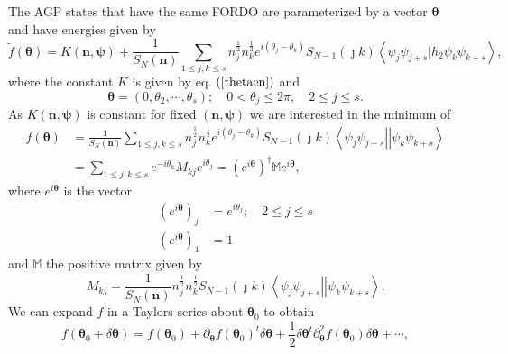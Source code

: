 \documentclass[aps,preprint]{revtex4}%
\begin{document}
The AGP states that have the same FORDO are parameterized by a vector
$\mathbf{\theta}$ and have energies given by
\begin{equation}
\tilde{f}\left(  \mathbf{\theta}\right)  =K\left(  \mathbf{n},\mathbf{\psi
}\right)  +\frac{1}{S_{N}\left(  \mathbf{n}\right)  }\sum_{1\leq j,k\leq
s}n_{j}^{\frac{1}{2}}n_{k}^{\frac{1}{2}}e^{i\left(  \theta_{j}-\theta
_{k}\right)  }S_{N-1}\left(  \jmath k\right)  \left\langle \psi_{j}\psi
_{j+s}|h_{2}\psi_{k}\psi_{k+s}\right\rangle ,
\end{equation}
where the constant $K$ is given by eq. $\left(  \ref{thetaen}\right)  $ and
\begin{equation}
\mathbf{\theta}=\left(  0,\theta_{2},\cdots,\theta_{s}\right)  ;\quad
0<\theta_{j}\leq2\pi,\quad2\leq j\leq s.
\end{equation}
As $K\left(  \mathbf{n},\mathbf{\psi}\right)  $ is constant for fixed $\left(
\mathbf{n},\mathbf{\psi}\right)  $ we are interested in the minimum of
\begin{align}
f\left(  \mathbf{\theta}\right)   &  =\frac{1}{S_{N}\left(  \mathbf{n}\right)
}\sum_{1\leq j,k\leq s}n_{j}^{\frac{1}{2}}n_{k}^{\frac{1}{2}}e^{i\left(
\theta_{j}-\theta_{k}\right)  }S_{N-1}\left(  \jmath k\right)  \left\langle
\psi_{j}\psi_{j+s}\right\vert \left\vert \psi_{k}\psi_{k+s}\right\rangle
\nonumber\\
&  =\sum_{1\leq j,k\leq s}e^{-i\theta_{k}}M_{kj}e^{i\theta_{j}}=\left(
e^{i\mathbf{\theta}}\right)  ^{\dagger}\mathbb{M}e^{i\mathbf{\theta}},
\end{align}
where $e^{i\mathbf{\theta}}$ is the vector
\begin{align}
\left(  e^{i\mathbf{\theta}}\right)  _{j}  &  =e^{i\theta_{j}};\quad2\leq
j\leq s\nonumber\\
\left(  e^{i\mathbf{\theta}}\right)  _{1}  &  =1
\end{align}
and $\mathbb{M}$ the positive matrix given by
\begin{equation}
M_{kj}=\frac{1}{S_{N}\left(  \mathbf{n}\right)  }n_{j}^{\frac{1}{2}}%
n_{k}^{\frac{1}{2}}S_{N-1}\left(  \jmath k\right)  \left\langle \psi_{j}%
\psi_{j+s}\right\vert \left\vert \psi_{k}\psi_{k+s}\right\rangle .
\end{equation}
We can expand $f$ in a Taylors series about $\mathbf{\theta}_{0}$ to obtain
\begin{equation}
f\left(  \mathbf{\theta}_{0}+\delta\mathbf{\theta}\right)  =f\left(
\mathbf{\theta}_{0}\right)  +\partial_{\mathbf{\theta}}f\left(  \mathbf{\theta
}_{0}\right)  ^{t}\delta\mathbf{\theta}+\frac{1}{2}\delta\mathbf{\theta}%
^{t}\partial_{\mathbf{\theta}}^{2}f\left(  \mathbf{\theta}_{0}\right)
\delta\mathbf{\theta+\cdots,}%
\end{equation}
\end{document}
